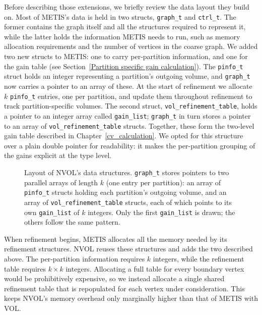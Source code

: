 Before describing those extensions, we briefly review the data layout they build on. Most of METIS's data is held in two structs, \texttt{graph\_t} and \texttt{ctrl\_t}. The former contains the graph itself and all the structures required to represent it, while the latter holds the information METIS needs to run, such as memory allocation requirements and the number of vertices in the coarse graph. We added two new structs to METIS: one to carry per-partition information, and one for the gain table (see Section~\ref{Partition specific gain calculation}). The \texttt{pinfo\_t} struct holds an integer representing a partition's outgoing volume, and \texttt{graph\_t} now carries a pointer to an array of these. At the start of refinement we allocate $k$ \texttt{pinfo\_t} entries, one per partition, and update them throughout refinement to track partition-specific volumes. The second struct, \texttt{vol\_refinement\_table}, holds a pointer to an integer array called \texttt{gain\_list}; \texttt{graph\_t} in turn stores a pointer to an array of \texttt{vol\_refinement\_table} structs. Together, these form the two-level gain table described in Chapter~\ref{cv_calculation}. We opted for this structure over a plain double pointer for readability: it makes the per-partition grouping of the gains explicit at the type level.

\begin{figure}[h]
	\centering
	\scalebox{0.8}{}
	\caption{Layout of NVOL's data structures. \texttt{graph\_t} stores pointers to two parallel arrays of length $k$ (one entry per partition): an array of \texttt{pinfo\_t} structs holding each partition's outgoing volume, and an array of \texttt{vol\_refinement\_table} structs, each of which points to its own \texttt{gain\_list} of $k$ integers. Only the first \texttt{gain\_list} is drawn; the others follow the same pattern.}

	\label{fig:data_structs}
\end{figure}

When refinement begins, METIS allocates all the memory needed by its refinement structures. NVOL reuses these structures and adds the two described above. The per-partition information requires $k$ integers, while the refinement table requires $k \times k$ integers. Allocating a full table for every boundary vertex would be prohibitively expensive, so we instead allocate a single shared refinement table that is repopulated for each vertex under consideration. This keeps NVOL's memory overhead only marginally higher than that of METIS with VOL.

